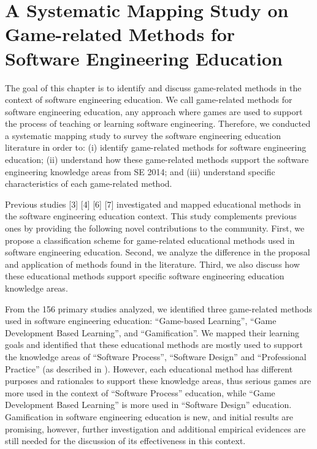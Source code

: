 \chapter{A Systematic Mapping Study on Game-related Methods for Software Engineering Education}
\label{ch:sms}

The goal of this chapter is to identify and discuss game-related methods in the context of software engineering education. We call game-related methods for software engineering education, any approach where games are used to support the process of teaching or learning software engineering. Therefore, we conducted a systematic mapping study to survey the software engineering education literature in order to: (i) identify game-related methods for software engineering education; (ii) understand how these game-related methods support the software engineering knowledge areas from SE 2014; and (iii) understand specific characteristics of each game-related method. 

Previous studies \citep{Marques:2014, Malik:2012, Caulfield:2011, Kosa:2016}[3] [4] [6] [7] investigated and mapped educational methods in the software engineering education context. This study complements previous ones by providing the following novel contributions to the community. First, we propose a classification scheme for game-related educational methods used in software engineering education. Second, we analyze the difference in the proposal and application of methods found in the literature. Third, we also discuss how these educational methods support specific software engineering education knowledge areas.

From the 156 primary studies analyzed, we identified three game-related methods used in software engineering education: “Game-based Learning”, “Game Development Based Learning”, and “Gamification”. We mapped their learning goals and identified that these educational methods are mostly used to support the knowledge areas of “Software Process”, “Software Design” and “Professional Practice” (as described in \cite{Acm:2015}). However, each educational method has different purposes and rationales to support these knowledge areas, thus serious games are more used in the context of “Software Process” education, while “Game Development Based Learning” is more used in “Software Design” education. Gamification in software engineering education is new, and initial results are promising, however, further investigation and additional empirical evidences are still needed for the discussion of its effectiveness in this context.

